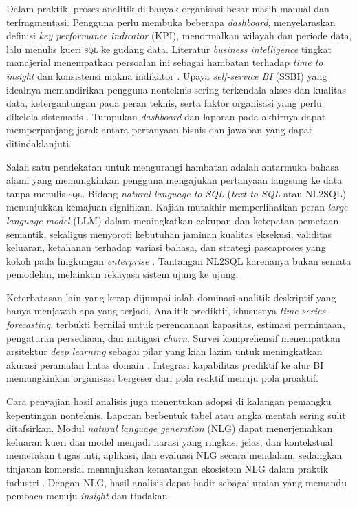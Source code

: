 \documentclass[12pt,a4paper,oneside]{book}
\begin{document}
Dalam praktik, proses analitik di banyak organisasi besar masih manual dan terfragmentasi. Pengguna perlu membuka beberapa \textit{dashboard}, menyelaraskan definisi \textit{key performance indicator} (KPI), menormalkan wilayah dan periode data, lalu menulis kueri \textsc{sql} ke gudang data. Literatur \textit{business intelligence} tingkat manajerial menempatkan persoalan ini sebagai hambatan terhadap \textit{time to insight} dan konsistensi makna indikator \parencite{Sharda2020}. Upaya \textit{self-service BI} (SSBI) yang idealnya memandirikan pengguna nonteknis sering terkendala akses dan kualitas data, ketergantungan pada peran teknis, serta faktor organisasi yang perlu dikelola sistematis \parencite{Lennerholt2021,Lennerholt2023}. Tumpukan \textit{dashboard} dan laporan pada akhirnya dapat memperpanjang jarak antara pertanyaan bisnis dan jawaban yang dapat ditindaklanjuti.

Salah satu pendekatan untuk mengurangi hambatan adalah antarmuka bahasa alami yang memungkinkan pengguna mengajukan pertanyaan langsung ke data tanpa menulis \textsc{sql}. Bidang \textit{natural language to SQL} (\textit{text-to-SQL} atau NL2SQL) menunjukkan kemajuan signifikan. Kajian mutakhir memperlihatkan peran \textit{large language model} (LLM) dalam meningkatkan cakupan dan ketepatan pemetaan semantik, sekaligus menyoroti kebutuhan jaminan kualitas eksekusi, validitas keluaran, ketahanan terhadap variasi bahasa, dan strategi pascaproses yang kokoh pada lingkungan \textit{enterprise} \parencite{Gao2023,Li2024}. Tantangan NL2SQL karenanya bukan semata pemodelan, melainkan rekayasa sistem ujung ke ujung.

Keterbatasan lain yang kerap dijumpai ialah dominasi analitik deskriptif yang hanya menjawab apa yang terjadi. Analitik prediktif, khususnya \textit{time series forecasting}, terbukti bernilai untuk perencanaan kapasitas, estimasi permintaan, pengaturan persediaan, dan mitigasi \textit{churn}. Survei komprehensif menempatkan arsitektur \textit{deep learning} sebagai pilar yang kian lazim untuk meningkatkan akurasi peramalan lintas domain \parencite{Lim2021,Benidis2020}. Integrasi kapabilitas prediktif ke alur BI memungkinkan organisasi bergeser dari pola reaktif menuju pola proaktif.

Cara penyajian hasil analisis juga menentukan adopsi di kalangan pemangku kepentingan nonteknis. Laporan berbentuk tabel atau angka mentah sering sulit ditafsirkan. Modul \textit{natural language generation} (NLG) dapat menerjemahkan keluaran kueri dan model menjadi narasi yang ringkas, jelas, dan kontekstual. \parencite{Gatt2018} memetakan tugas inti, aplikasi, dan evaluasi NLG secara mendalam, sedangkan tinjauan komersial menunjukkan kematangan ekosistem NLG dalam praktik industri \parencite{Dale2020}. Dengan NLG, hasil analisis dapat hadir sebagai uraian yang memandu pembaca menuju \textit{insight} dan tindakan.
\end{document}
